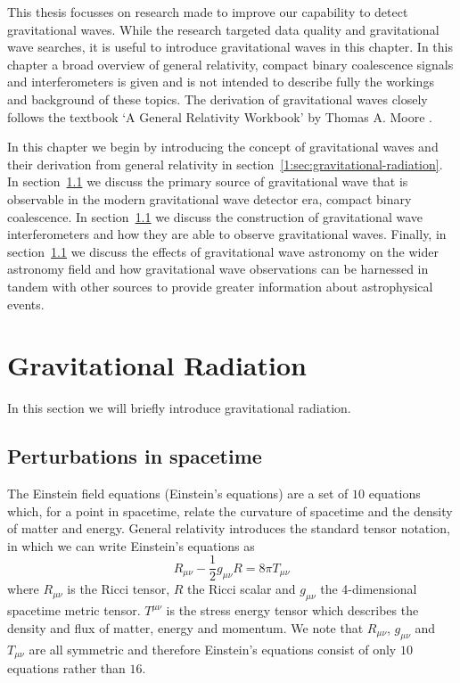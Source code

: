
This thesis focusses on research made to improve our capability to detect gravitational waves. While the research targeted data quality and gravitational wave searches, it is useful to introduce gravitational waves in this chapter. In this chapter a broad overview of general relativity, compact binary coalescence signals and interferometers is given and is not intended to describe fully the workings and background of these topics. The derivation of gravitational waves closely follows the textbook `A General Relativity Workbook' by Thomas A. Moore \cite{moore_2013}.

In this chapter we begin by introducing the concept of gravitational waves and their derivation from general relativity in section~\ref{1:sec:gravitational-radiation}. In section~\ref{} we discuss the primary source of gravitational wave that is observable in the modern gravitational wave detector era, compact binary coalescence. In section~\ref{} we discuss the construction of gravitational wave interferometers and how they are able to observe gravitational waves. Finally, in section~\ref{} we discuss the effects of gravitational wave astronomy on the wider astronomy field and how gravitational wave observations can be harnessed in tandem with other sources to provide greater information about astrophysical events.

\section{\label{1:sec:gravitational-radiation}Gravitational Radiation}

In this section we will briefly introduce gravitational radiation.

\subsection{\label{2:sec:perturbations}Perturbations in spacetime}

The Einstein field equations (Einstein's equations) are a set of $10$ equations which, for a point in spacetime, relate the curvature of spacetime and the density of matter and energy. General relativity introduces the standard tensor notation, in which we can write Einstein's equations as
%
\begin{equation}
   R_{\mu \nu} - \frac{1}{2}g_{\mu \nu}R = 8 \pi T_{\mu \nu}
   \label{2:eqn:EFE}
\end{equation}
%
where $R_{\mu \nu}$ is the Ricci tensor, $R$ the Ricci scalar and $g_{\mu \nu}$ the 4-dimensional spacetime metric tensor. $T^{\mu \nu}$ is the stress energy tensor which describes the density and flux of matter, energy and momentum. We note that $R_{\mu \nu}$, $g_{\mu \nu}$ and $T_{\mu \nu}$ are all symmetric and therefore Einstein's equations consist of only $10$ equations rather than $16$.


